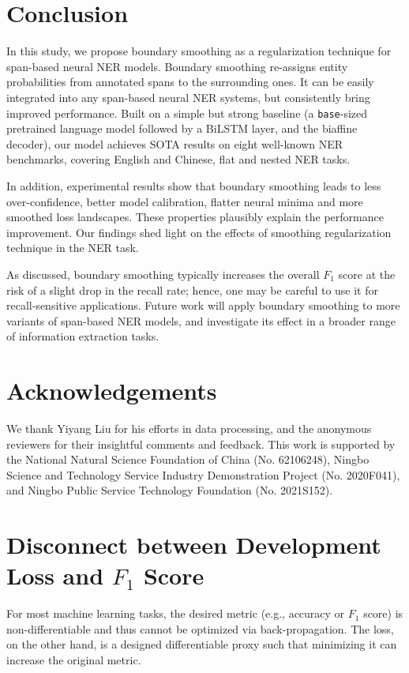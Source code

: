 \documentclass[11pt]{article}
\begin{document}
\section{Conclusion}
In this study, we propose boundary smoothing as a regularization technique for span-based neural NER models. Boundary smoothing re-assigns entity probabilities from annotated spans to the surrounding ones. It can be easily integrated into any span-based neural NER systems, but consistently bring improved performance. Built on a simple but strong baseline (a \texttt{base}-sized pretrained language model followed by a BiLSTM layer, and the biaffine decoder), our model achieves SOTA results on eight well-known NER benchmarks, covering English and Chinese, flat and nested NER tasks. 

In addition, experimental results show that boundary smoothing leads to less over-confidence, better model calibration, flatter neural minima and more smoothed loss landscapes. These properties plausibly explain the performance improvement. Our findings shed light on the effects of smoothing regularization technique in the NER task. 

As discussed, boundary smoothing typically increases the overall $F_1$ score at the risk of a slight drop in the recall rate; hence, one may be careful to use it for recall-sensitive applications. Future work will apply boundary smoothing to more variants of span-based NER models, and investigate its effect in a broader range of information extraction tasks. 


\section*{Acknowledgements}
We thank Yiyang Liu for his efforts in data processing, and the anonymous reviewers for their insightful comments and feedback. This work is supported by the National Natural Science Foundation of China (No. 62106248), Ningbo Science and Technology Service Industry Demonstration Project (No. 2020F041), and Ningbo Public Service Technology Foundation (No. 2021S152). 






\newpage
\appendix

\section{Disconnect between Development Loss and $F_1$ Score} \label{sec:dev-loss}
For most machine learning tasks, the desired metric (e.g., accuracy or $F_1$ score) is non-differentiable and thus cannot be optimized via back-propagation. The loss, on the other hand, is a designed differentiable proxy such that minimizing it can increase the original metric. 
\end{document}
